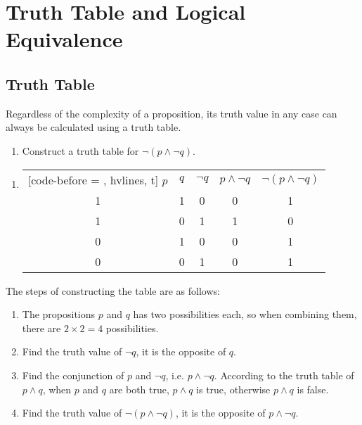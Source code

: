 \documentclass{report}
\begin{document}
\section{Truth Table and Logical Equivalence}

\subsection*{Truth Table}

Regardless of the complexity of a proposition, its truth value in any case can
always be calculated using a truth table. \vspace{0.5cm}
\begin{enumerate}[label=\textbf{Example \arabic*}, leftmargin=*, start=9]
    \item Construct a truth table for $\neg(p\land\neg q)$.
\end{enumerate}
\begin{enumerate}[label=\textbf{Sol.}, leftmargin=*]
    \item
          \begin{NiceTabular}{|c|c|c|c|c|}[code-before = , hvlines, t]
              $p$ & $q$ & $\neg q$ & $p \land \neg q$ & $\neg(p \land \neg q)$ \\
              1   & 1   & 0        & 0                & 1                      \\
              1   & 0   & 1        & 1                & 0                      \\
              0   & 1   & 0        & 0                & 1                      \\
              0   & 0   & 1        & 0                & 1                      \\
          \end{NiceTabular}
\end{enumerate}

The steps of constructing the table are as follows:
\begin{enumerate}[leftmargin=*, label=\indent(\arabic*)]
    \item The propositions $p$ and $q$ has two possibilities each, so when combining
          them, there are $2 \times 2 = 4$ possibilities.
    \item Find the truth value of $\neg q$, it is the opposite of $q$.
    \item Find the conjunction of $p$ and $\neg q$, i.e. $p \land \neg q$. According to
          the truth table of $p \land q$, when $p$ and $q$ are both true, $p \land q$ is
          true, otherwise $p \land q$ is false.
    \item Find the truth value of $\neg(p \land \neg q)$, it is the opposite of $p \land
              \neg q$.
\end{enumerate}
\end{document}
